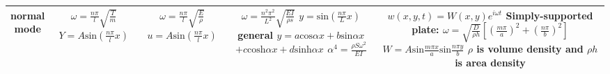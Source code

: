 \documentclass{article}
\begin{document}
\begin{multicols*}{3}
\begin{table}[htbp]
\begin{tabular}{|c|c|c|c|c|}
      \hline
      \makecell[c]{normal\\ mode}& \makecell[c]{$\omega=\frac{n\pi}{l}\sqrt{\frac{T}{m}}$ \\$Y=A \text{sin}(\frac{n\pi}{l}x)$}
      &\makecell[c]{$\omega=\frac{n\pi}{l}\sqrt{\frac{E}{\rho}}$\\ $u=A \text{sin}(\frac{n\pi}{l}x)$}
      &\makecell[c]{
        $\omega=\frac{n^{2}\pi^{2}}{L^{2}}\sqrt{\frac{EI}{\rho s}}$
        $y=\text{sin}(\frac{n \pi}{L}x)$\\
        general $y=a\text{cos}\alpha x+b\text{sin}\alpha x$\\
        $+c \text{cosh}\alpha x+d \text{sinh}\alpha x$\\
        $\alpha^4 = \frac{\rho S \omega^2}{EI}$  
      }
      &\makecell[c]{
        $w(x,y,t)=W(x,y)e^{i\omega t}$\\
        Simply-supported plate:\\
        $\omega=\sqrt{\frac{D}{\rho h}}[(\frac{m\pi}{a})^{2}+(\frac{n \pi}{b})^{2}]$\\
      $W=A\text{sin}\frac{m\pi x}{a}\text{sin}\frac{n \pi y}{b}$\\
      \textbf{$\rho$ is volume density and $\rho h$ is area density}
      }\\
      \hline
    \end{tabular}
  \end{table}

\end{multicols*}
\end{document}
